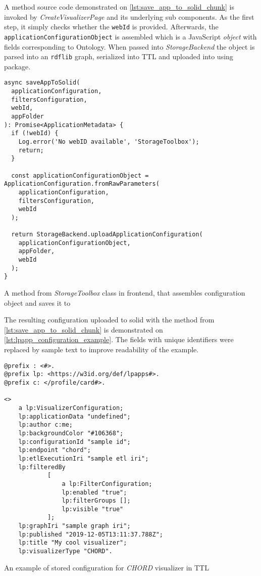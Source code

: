 A method source code demonstrated on \autoref{lst:save_app_to_solid_chunk} is invoked by \textit{CreateVisualizerPage} and its underlying sub components. As the first step, it simply checks whether the \texttt{webId} is provided. Afterwards, the \texttt{applicationConfigurationObject} is assembled which is a JavaScript \textit{object} with fields corresponding to \lpas{} Ontology. When passed into \textit{StorageBackend} the object is parsed into an \texttt{rdflib} graph, serialized into TTL and uploaded into \solid{} using \lpas{} package.

\begin{listing}[H]    
\begin{verbatim}
async saveAppToSolid(
  applicationConfiguration,
  filtersConfiguration,
  webId,
  appFolder
): Promise<ApplicationMetadata> {
  if (!webId) {
    Log.error('No webID available', 'StorageToolbox');
    return;
  }

  const applicationConfigurationObject = ApplicationConfiguration.fromRawParameters(
    applicationConfiguration,
    filtersConfiguration,
    webId
  );

  return StorageBackend.uploadApplicationConfiguration(
    applicationConfigurationObject,
    appFolder,
    webId
  );
}
\end{verbatim}
\caption{A method from \textit{StorageToolbox} class in\lpa{} frontend, that assembles configuration object and saves it to \solid{}} 
\label{lst:save_app_to_solid_chunk}
\end{listing}

The resulting \lpa{} configuration uploaded to solid with the method from \autoref{lst:save_app_to_solid_chunk} is demonstrated on \autoref{lst:lpapp_configuration_example}. The fields with unique identifiers were replaced by sample text to improve readability of the example. 

\begin{listing}[H]    
\begin{verbatim}
@prefix : <#>.
@prefix lp: <https://w3id.org/def/lpapps#>.
@prefix c: </profile/card#>.

<>
    a lp:VisualizerConfiguration;
    lp:applicationData "undefined";
    lp:author c:me;
    lp:backgroundColor "#106368";
    lp:configurationId "sample id";
    lp:endpoint "chord";
    lp:etlExecutionIri "sample etl iri";
    lp:filteredBy
            [
                a lp:FilterConfiguration;
                lp:enabled "true";
                lp:filterGroups [];
                lp:visible "true"
            ];
    lp:graphIri "sample graph iri";
    lp:published "2019-12-05T13:11:37.788Z";
    lp:title "My cool visualizer";
    lp:visualizerType "CHORD".
\end{verbatim}
\caption{An example of stored \lpa{} configuration for \textit{CHORD} visualizer in TTL} 
\label{lst:lpapp_configuration_example}
\end{listing}

